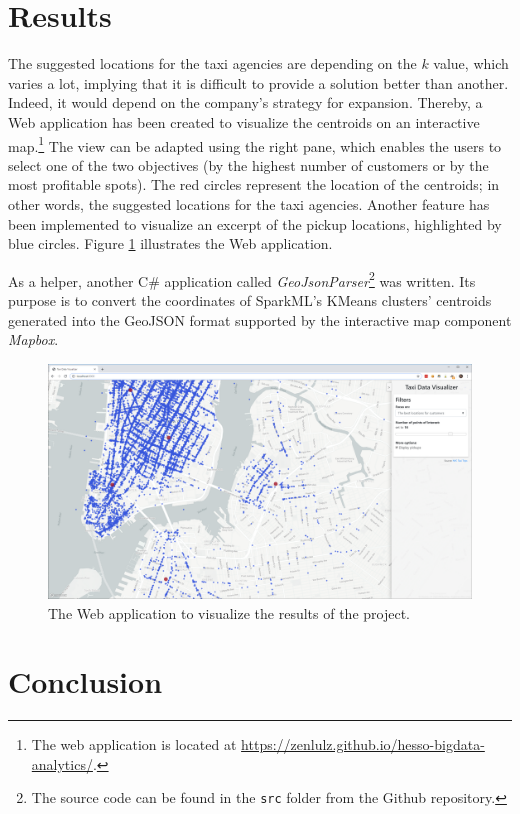 \documentclass[a4paper]{article}
\begin{document}
\section{Results}
The suggested locations for the taxi agencies are depending on the $k$ value, which varies a lot, implying that it is difficult to provide a solution better than another. Indeed, it would depend on the company's strategy for expansion. Thereby, a Web application has been created to visualize the centroids on an interactive map.\footnote{The web application is located at \url{https://zenlulz.github.io/hesso-bigdata-analytics/}.} The view can be adapted using the right pane, which enables the users to select one of the two objectives (by the highest number of customers or by the most profitable spots). The red circles represent the location of the centroids; in other words, the suggested locations for the taxi agencies. Another feature has been implemented to visualize an excerpt of the pickup locations, highlighted by blue circles. Figure \ref{fig:web-app} illustrates the Web application.

As a helper, another C\# application called \emph{GeoJsonParser}\footnote{The source code can be found in the \texttt{src} folder from the Github repository.} was written. Its purpose is to convert the coordinates of SparkML's KMeans clusters' centroids generated into the GeoJSON format supported by the interactive map component \emph{Mapbox}.

\begin{figure}
  \centering
  \includegraphics[width=\textwidth]{images/web-app.png}
  \caption{The Web application to visualize the results of the project.}
  \label{fig:web-app}
\end{figure}

\section{Conclusion}
\end{document}
